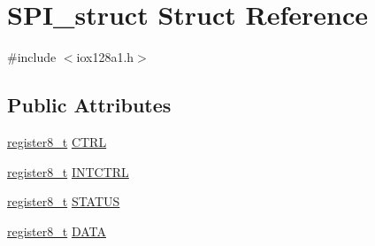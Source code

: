 \hypertarget{struct_s_p_i__struct}{
\section{SPI\_\-struct Struct Reference}
\label{struct_s_p_i__struct}
}


{\ttfamily \#include $<$iox128a1.h$>$}

\subsection*{Public Attributes}
\begin{DoxyCompactItemize}
\item 
\hyperlink{iox128a1_8h_a6a0649252b392263406882923b04a9db}{register8\_\-t} \hyperlink{struct_s_p_i__struct_ae3441c09ddb2d565c0dda101b4a911b0}{CTRL}
\item 
\hyperlink{iox128a1_8h_a6a0649252b392263406882923b04a9db}{register8\_\-t} \hyperlink{struct_s_p_i__struct_a090c51ff220328d67af12ec8de56c775}{INTCTRL}
\item 
\hyperlink{iox128a1_8h_a6a0649252b392263406882923b04a9db}{register8\_\-t} \hyperlink{struct_s_p_i__struct_a9427355b9c7423dfbeadb1a5c906f86f}{STATUS}
\item 
\hyperlink{iox128a1_8h_a6a0649252b392263406882923b04a9db}{register8\_\-t} \hyperlink{struct_s_p_i__struct_aa01a4dd46ef17788963db5551a1d63ae}{DATA}
\end{DoxyCompactItemize}


